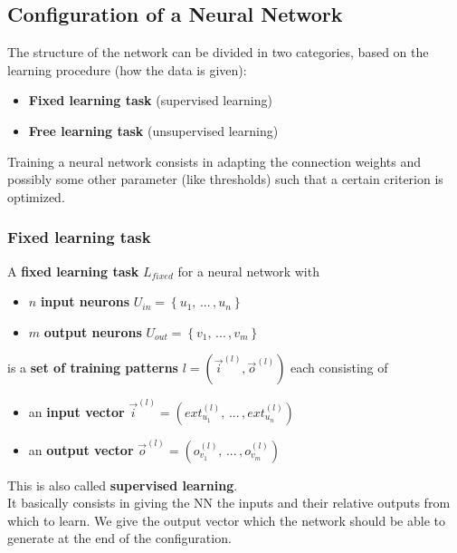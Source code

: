 \newpage

\subsection{Configuration of a Neural Network}
The structure of the network can be divided in two categories, based on the learning procedure (how the data is given):
\begin{itemize}
	\item \textbf{Fixed learning task} (supervised learning)\\
	\item \textbf{Free learning task} (unsupervised learning)\\
\end{itemize}

Training a neural network consists in adapting the connection weights and possibly some other parameter (like thresholds) such that a certain criterion is optimized.\\

\newpage

\subsubsection{Fixed learning task}
A \textbf{fixed learning task} $L_{fixed}$ for a neural network with
\begin{itemize}
	\item $n$ \textbf{input neurons} $U_{in} = \left\{u_1, \, ... \, , u_n \right\}$
	\item $m$ \textbf{output neurons} $U_{out} = \left\{v_1, \, ... \, , v_m \right\}$
\end{itemize}
is a \textbf{set of training patterns} $l = \left(\vec{i}^{(l)}, \vec{o}^{(l)}\right)$ each consisting of 
\begin{itemize}
	\item an \textbf{input vector }$\vec{i}^{(l)} = \left(ext_{u_1}^{(l)}, \, ... \, , ext_{u_n}^{(l)}\right)$
	\item an \textbf{output vector} $\vec{o}^{(l)} = \left(o_{v_1}^{(l)}, \, ... \, , o_{v_m}^{(l)}\right)$
\end{itemize}

This is also called \textbf{supervised learning}.\\
It basically consists in giving the NN the inputs and their relative outputs from which to learn. We give the output vector which the network should be able to generate at the end of the configuration.\\

